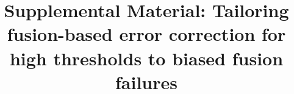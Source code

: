 \documentclass[reprint,
groupedaddress,
 prl,amsmath,amssymb,
 aps]{revtex4-2}
\makeatletter
\def\maketitle{
	\@author@finish
	\title@column\titleblock@produce
	\suppressfloats[t]}
\theoremstyle{definition}
\makeatother
\begin{document}
%

\setcounter{equation}{0}
\setcounter{figure}{0}
\setcounter{table}{0}
\setcounter{section}{0}
\makeatletter

\renewcommand{\theequation}{S\arabic{equation}}
\renewcommand{\thefigure}{S\arabic{figure}}
\renewcommand{\thetable}{S\arabic{table}}
\renewcommand{\thesection}{S\arabic{section}}

\title{Supplemental Material: Tailoring fusion-based error correction for high thresholds to biased fusion failures}

\clearpage
\maketitle
\onecolumngrid

\begin{bibunit}



\end{bibunit}
\end{document}
